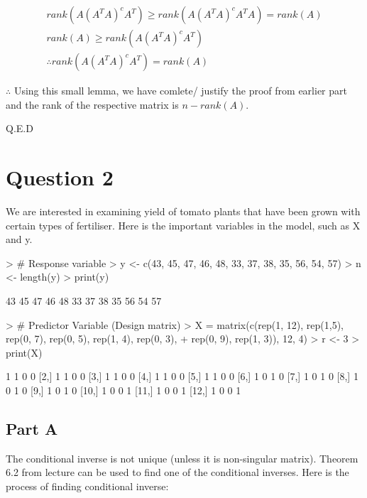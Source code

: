 \documentclass{article}
\begin{document}
\begin{eqnarray*}
  rank(A(A^TA)^cA^T) \geq rank(A(A^TA)^cA^TA) = rank(A) \\
  rank(A) \geq rank(A(A^TA)^cA^T) \\
  \therefore rank(A(A^TA)^cA^T) = rank(A)
\end{eqnarray*}

\noindent $\therefore$ Using this small lemma, we have comlete/ justify the proof from earlier part and the rank of the respective matrix is $n-rank(A)$.
\begin{flushright}
Q.E.D
\end{flushright}

\section{Question 2}
We are interested in examining yield of tomato plants that have been grown with certain types of fertiliser. Here is the important variables in the model, such as X and y.

\begin{Schunk}
\begin{Sinput}
> # Response variable
> y <- c(43, 45, 47, 46, 48, 33, 37, 38, 35, 56, 54, 57)
> n <- length(y)
> print(y)
\end{Sinput}
\begin{Soutput}
 [1] 43 45 47 46 48 33 37 38 35 56 54 57
\end{Soutput}
\begin{Sinput}
> # Predictor Variable (Design matrix)
> X = matrix(c(rep(1, 12), rep(1,5), rep(0, 7), rep(0, 5), rep(1, 4), rep(0, 3), 
+              rep(0, 9), rep(1, 3)), 12, 4)
> r <- 3 
> print(X)
\end{Sinput}
\begin{Soutput}
      [,1] [,2] [,3] [,4]
 [1,]    1    1    0    0
 [2,]    1    1    0    0
 [3,]    1    1    0    0
 [4,]    1    1    0    0
 [5,]    1    1    0    0
 [6,]    1    0    1    0
 [7,]    1    0    1    0
 [8,]    1    0    1    0
 [9,]    1    0    1    0
[10,]    1    0    0    1
[11,]    1    0    0    1
[12,]    1    0    0    1
\end{Soutput}
\end{Schunk}

\subsection{Part A}
The conditional inverse is not unique (unless it is non-singular matrix). Theorem 6.2 from lecture can be used to find one of the conditional inverses. Here is the process of finding conditional inverse:
\end{document}
